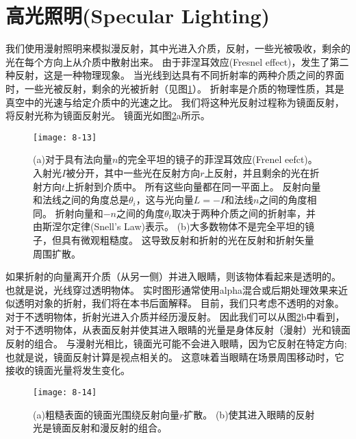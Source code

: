 \section{高光照明(Specular Lighting)}
\begin{flushleft}
我们使用漫射照明来模拟漫反射，其中光进入介质，反射，一些光被吸收，剩余的光在每个方向上从介质中散射出来。 由于菲涅耳效应(Fresnel effect)，发生了第二种反射，这是一种物理现象。 当光线到达具有不同折射率的两种介质之间的界面时，一些光被反射，剩余的光被折射（见图\ref{fig:8-13}）。 折射率是介质的物理性质，其是真空中的光速与给定介质中的光速之比。 我们将这种光反射过程称为镜面反射，将反射光称为镜面反射光。 镜面光如图\ref{fig:8-14}a所示。
\end{flushleft}

\begin{figure}[h]
    \texttt{[image: 8-13]}
    \centering
    \caption{(a)对于具有法向量$n$的完全平坦的镜子的菲涅耳效应(Frenel eefct)。 入射光$I$被分开，其中一些光在反射方向$r$上反射，并且剩余的光在折射方向$t$上折射到介质中。 所有这些向量都在同一平面上。 反射向量和法线之间的角度总是$θ_{i}$，这与光向量$L=-I$和法线$n$之间的角度相同。 折射向量和$-n$之间的角度$θ_{t}$取决于两种介质之间的折射率，并由斯涅尔定律(Snell's Law)表示。 (b)大多数物体不是完全平坦的镜子，但具有微观粗糙度。 这导致反射和折射的光在反射和折射矢量周围扩散。}
    \label{fig:8-13}
\end{figure}

\begin{flushleft}
如果折射的向量离开介质（从另一侧）并进入眼睛，则该物体看起来是透明的。 也就是说，光线穿过透明物体。 实时图形通常使用alpha混合或后期处理效果来近似透明对象的折射，我们将在本书后面解释。 目前，我们只考虑不透明的对象。\\
对于不透明物体，折射光进入介质并经历漫反射。 因此我们可以从图\ref{fig:8-14}b中看到，对于不透明物体，从表面反射并使其进入眼睛的光量是身体反射（漫射）光和镜面反射的组合。 与漫射光相比，镜面光可能不会进入眼睛，因为它反射在特定方向; 也就是说，镜面反射计算是视点相关的。 这意味着当眼睛在场景周围移动时，它接收的镜面光量将发生变化。\\
\end{flushleft}

\begin{figure}[h]
    \texttt{[image: 8-14]}
    \centering
    \caption{(a)粗糙表面的镜面光围绕反射向量$r$扩散。 (b)使其进入眼睛的反射光是镜面反射和漫反射的组合。}
    \label{fig:8-14}
\end{figure}

